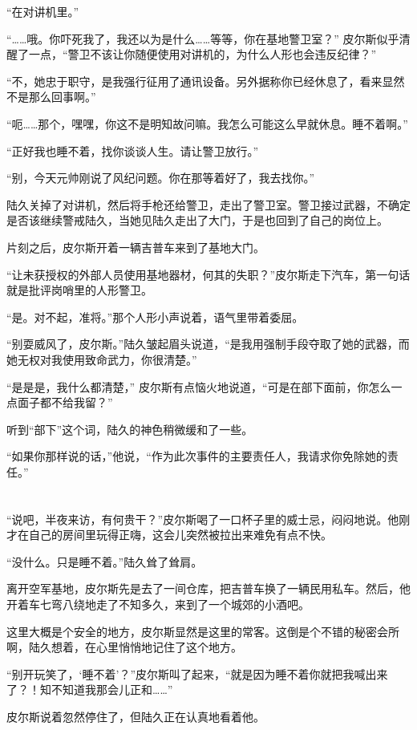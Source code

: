 “在对讲机里。”

“……哦。你吓死我了，我还以为是什么……等等，你在基地警卫室？” 皮尔斯似乎清醒了一点，“警卫不该让你随便使用对讲机的，为什么人形也会违反纪律？” 

“不，她忠于职守，是我强行征用了通讯设备。另外据称你已经休息了，看来显然不是那么回事啊。”

“呃……那个，嘿嘿，你这不是明知故问嘛。我怎么可能这么早就休息。睡不着啊。”

“正好我也睡不着，找你谈谈人生。请让警卫放行。”

“别，今天元帅刚说了风纪问题。你在那等着好了，我去找你。”

陆久关掉了对讲机，然后将手枪还给警卫，走出了警卫室。警卫接过武器，不确定是否该继续警戒陆久，当她见陆久走出了大门，于是也回到了自己的岗位上。

片刻之后，皮尔斯开着一辆吉普车来到了基地大门。

“让未获授权的外部人员使用基地器材，何其的失职？”皮尔斯走下汽车，第一句话就是批评岗哨里的人形警卫。

“是。对不起，准将。”那个人形小声说着，语气里带着委屈。

“别耍威风了，皮尔斯。”陆久皱起眉头说道，“是我用强制手段夺取了她的武器，而她无权对我使用致命武力，你很清楚。”

“是是是，我什么都清楚，” 皮尔斯有点恼火地说道，“可是在部下面前，你怎么一点面子都不给我留？”

听到“部下”这个词，陆久的神色稍微缓和了一些。

“如果你那样说的话，”他说，“作为此次事件的主要责任人，我请求你免除她的责任。”
\section*{}

“说吧，半夜来访，有何贵干？”皮尔斯喝了一口杯子里的威士忌，闷闷地说。他刚才在自己的房间里玩得正嗨，这会儿突然被拉出来难免有点不快。

“没什么。只是睡不着。”陆久耸了耸肩。

离开空军基地，皮尔斯先是去了一间仓库，把吉普车换了一辆民用私车。然后，他开着车七弯八绕地走了不知多久，来到了一个城郊的小酒吧。

这里大概是个安全的地方，皮尔斯显然是这里的常客。这倒是个不错的秘密会所啊，陆久想着，在心里悄悄地记住了这个地方。

“别开玩笑了，‘睡不着’？”皮尔斯叫了起来，“就是因为睡不着你就把我喊出来了？！知不知道我那会儿正和……”

皮尔斯说着忽然停住了，但陆久正在认真地看着他。

